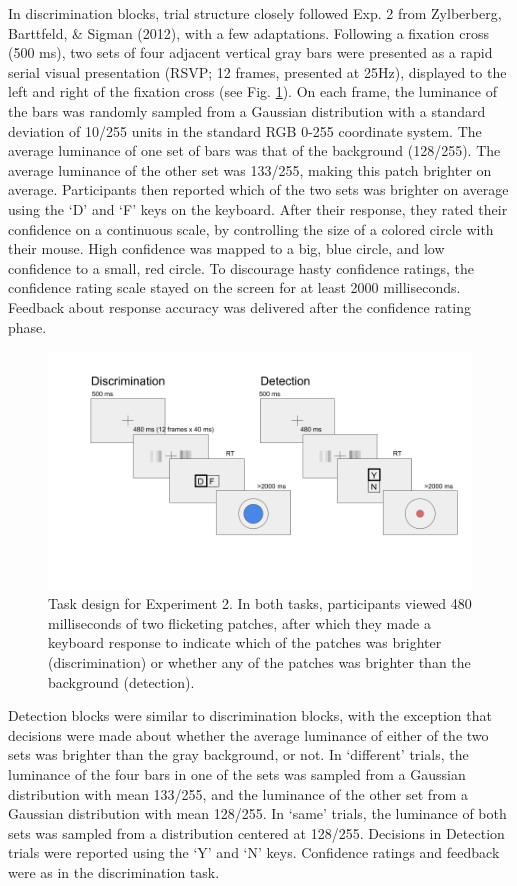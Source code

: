 \documentclass[12pt,twoside]{reedthesis}
\begin{document}
In discrimination blocks, trial structure closely followed Exp. 2 from Zylberberg, Barttfeld, \& Sigman (2012), with a few adaptations. Following a fixation cross (500 ms), two sets of four adjacent vertical gray bars were presented as a rapid serial visual presentation (RSVP; 12 frames, presented at 25Hz), displayed to the left and right of the fixation cross (see Fig. \ref{fig:RC-exp2-design}). On each frame, the luminance of the bars was randomly sampled from a Gaussian distribution with a standard deviation of 10/255 units in the standard RGB 0-255 coordinate system. The average luminance of one set of bars was that of the background (128/255). The average luminance of the other set was 133/255, making this patch brighter on average. Participants then reported which of the two sets was brighter on average using the `D' and `F' keys on the keyboard. After their response, they rated their confidence on a continuous scale, by controlling the size of a colored circle with their mouse. High confidence was mapped to a big, blue circle, and low confidence to a small, red circle. To discourage hasty confidence ratings, the confidence rating scale stayed on the screen for at least 2000 milliseconds. Feedback about response accuracy was delivered after the confidence rating phase.
\begin{figure}
\includegraphics[width=\textwidth]{figure/RC/designExp2} \caption[Experimental design for Exp. 2]{Task design for Experiment 2. In both tasks, participants viewed 480 milliseconds of two flicketing patches, after which they made a keyboard response to indicate which of the patches was brighter (discrimination) or whether any of the patches was brighter than the background (detection). }\label{fig:RC-exp2-design}
\end{figure}
Detection blocks were similar to discrimination blocks, with the exception that decisions were made about whether the average luminance of either of the two sets was brighter than the gray background, or not. In `different' trials, the luminance of the four bars in one of the sets was sampled from a Gaussian distribution with mean 133/255, and the luminance of the other set from a Gaussian distribution with mean 128/255. In `same' trials, the luminance of both sets was sampled from a distribution centered at 128/255. Decisions in Detection trials were reported using the `Y' and `N' keys. Confidence ratings and feedback were as in the discrimination task.
\end{document}
